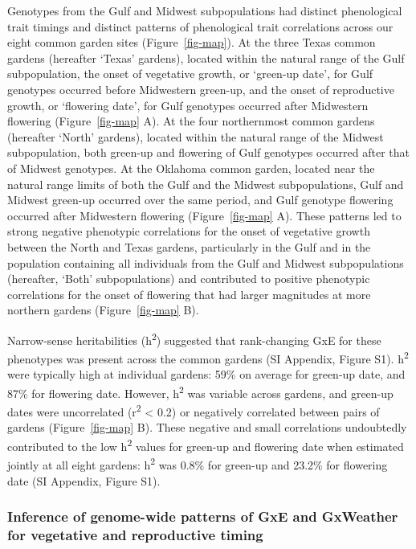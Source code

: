 \documentclass[
  9pt,
  twocolumn,
  twoside]{simple-article}%
\begin{document}
Genotypes from the Gulf and Midwest subpopulations had distinct
phenological trait timings and distinct patterns of phenological trait
correlations across our eight common garden sites
(Figure~\ref{fig-map}). At the three Texas common gardens (hereafter
`Texas' gardens), located within the natural range of the Gulf
subpopulation, the onset of vegetative growth, or `green-up date', for
Gulf genotypes occurred before Midwestern green-up, and the onset of
reproductive growth, or `flowering date', for Gulf genotypes occurred
after Midwestern flowering (Figure~\ref{fig-map} A). At the four
northernmost common gardens (hereafter `North' gardens), located within
the natural range of the Midwest subpopulation, both green-up and
flowering of Gulf genotypes occurred after that of Midwest genotypes. At
the Oklahoma common garden, located near the natural range limits of
both the Gulf and the Midwest subpopulations, Gulf and Midwest green-up
occurred over the same period, and Gulf genotype flowering occurred
after Midwestern flowering (Figure~\ref{fig-map} A). These patterns led
to strong negative phenotypic correlations for the onset of vegetative
growth between the North and Texas gardens, particularly in the Gulf and
in the population containing all individuals from the Gulf and Midwest
subpopulations (hereafter, `Both' subpopulations) and contributed to
positive phenotypic correlations for the onset of flowering that had
larger magnitudes at more northern gardens (Figure~\ref{fig-map} B).

Narrow-sense heritabilities (h\textsuperscript{2}) suggested that
rank-changing GxE for these phenotypes was present across the common
gardens (SI Appendix, Figure S1). h\textsuperscript{2} were typically
high at individual gardens: 59\% on average for green-up date, and 87\%
for flowering date. However, h\textsuperscript{2} was variable across
gardens, and green-up dates were uncorrelated (r\textsuperscript{2}
\textless{} 0.2) or negatively correlated between pairs of gardens
(Figure~\ref{fig-map} B). These negative and small correlations
undoubtedly contributed to the low h\textsuperscript{2} values for
green-up and flowering date when estimated jointly at all eight gardens:
h\textsuperscript{2} was 0.8\% for green-up and 23.2\% for flowering
date (SI Appendix, Figure S1).

\subsubsection{Inference of genome-wide patterns of GxE and GxWeather
for vegetative and reproductive
timing}\label{inference-of-genome-wide-patterns-of-gxe-and-gxweather-for-vegetative-and-reproductive-timing}
\end{document}

